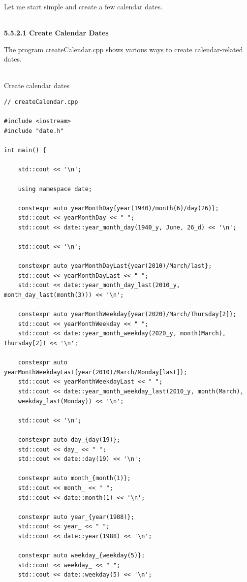 Let me start simple and create a few calendar dates.

\hspace*{\fill} \\ %
\noindent
\textbf{5.5.2.1\hspace{0.2cm} Create Calendar Dates}

The program createCalendar.cpp shows various ways to create calendar-related dates.

\hspace*{\fill} \\ %
\noindent
Create calendar dates
\begin{lstlisting}[style=styleCXX]
// createCalendar.cpp

#include <iostream>
#include "date.h"

int main() {

	std::cout << '\n';
	
	using namespace date;
	
	constexpr auto yearMonthDay{year(1940)/month(6)/day(26)};
	std::cout << yearMonthDay << " ";
	std::cout << date::year_month_day(1940_y, June, 26_d) << '\n';
	
	std::cout << '\n';
	
	constexpr auto yearMonthDayLast{year(2010)/March/last};
	std::cout << yearMonthDayLast << " ";
	std::cout << date::year_month_day_last(2010_y, month_day_last(month(3))) << '\n';
	
	constexpr auto yearMonthWeekday{year(2020)/March/Thursday[2]};
	std::cout << yearMonthWeekday << " ";
	std::cout << date::year_month_weekday(2020_y, month(March), Thursday[2]) << '\n';
	
	constexpr auto yearMonthWeekdayLast{year(2010)/March/Monday[last]};
	std::cout << yearMonthWeekdayLast << " ";
	std::cout << date::year_month_weekday_last(2010_y, month(March),
	weekday_last(Monday)) << '\n';
	
	std::cout << '\n';
	
	constexpr auto day_{day(19)};
	std::cout << day_ << " ";
	std::cout << date::day(19) << '\n';
	
	constexpr auto month_{month(1)};
	std::cout << month_ << " ";
	std::cout << date::month(1) << '\n';
	
	constexpr auto year_{year(1988)};
	std::cout << year_ << " ";
	std::cout << date::year(1988) << '\n';
	
	constexpr auto weekday_{weekday(5)};
	std::cout << weekday_ << " ";
	std::cout << date::weekday(5) << '\n';
	

\end{lstlisting}
